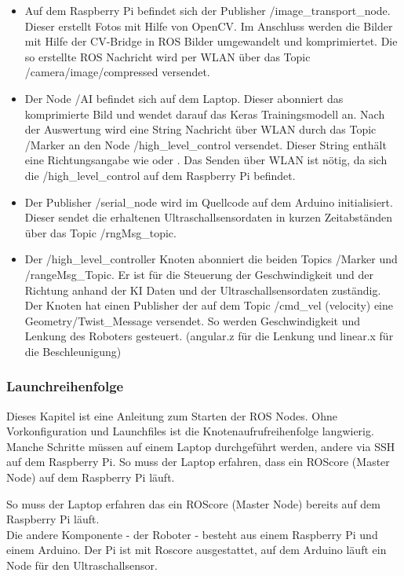 \documentclass[conference]{IEEEtran}
\begin{document}
	\begin{itemize}
		\item Auf dem Raspberry Pi befindet sich der Publisher 
		/image\_transport\_node. Dieser erstellt Fotos mit Hilfe von OpenCV. Im 
		Anschluss werden die Bilder mit Hilfe der CV-Bridge in ROS Bilder 
		umgewandelt und komprimiertet. Die so erstellte ROS Nachricht wird 
		per WLAN über das Topic /camera/image/compressed versendet.
		
		\item Der Node /AI befindet sich auf dem Laptop. Dieser abonniert das 
		komprimierte Bild und wendet darauf das Keras Trainingsmodell an. 
		Nach der Auswertung wird eine String Nachricht über WLAN durch 
		das Topic /Marker an den Node /high\_level\_control versendet. 
		Dieser String enthält eine Richtungsangabe wie  oder 
		. Das Senden über WLAN ist nötig, da sich die  
		/high\_level\_control auf dem Raspberry Pi befindet.
		
		\item Der Publisher /serial\_node wird im Quellcode auf dem Arduino initialisiert. Dieser sendet die erhaltenen Ultraschallsensordaten in kurzen Zeitabständen über das Topic /rngMsg\_topic.
		
		\item Der /high\_level\_controller Knoten abonniert die beiden Topics 
		/Marker und /rangeMsg\_Topic. Er ist für die Steuerung der 
		Geschwindigkeit und der Richtung anhand der KI Daten und der 
		Ultraschallsensordaten zuständig. Der Knoten hat einen Publisher der 
		auf dem  Topic /cmd\_vel (velocity) eine Geometry/Twist\_Message 
		versendet. So werden Geschwindigkeit und Lenkung des Roboters 
		gesteuert. (angular.z für die Lenkung und linear.x für die 
		Beschleunigung)
		
		
	\end{itemize}

	\subsubsection{Launchreihenfolge}%
	
	Dieses Kapitel ist eine Anleitung zum Starten der ROS Nodes. Ohne 
	Vorkonfiguration und Launchfiles ist 
	die Knotenaufrufreihenfolge langwierig. Manche Schritte müssen auf einem 
	Laptop durchgeführt werden, andere via SSH auf dem Raspberry Pi. So 
	muss der Laptop erfahren, dass ein ROScore (Master Node) auf dem Raspberry Pi läuft.
	
	So muss der Laptop
	erfahren das ein ROScore (Master Node) bereits auf dem
	Raspberry Pi läuft.
	\\
	Die andere Komponente - der Roboter - besteht aus einem Raspberry Pi 
	und einem Arduino.
	Der Pi ist mit Roscore ausgestattet, auf dem Arduino läuft ein Node für 
	den Ultraschallsensor.
	
\end{document}
